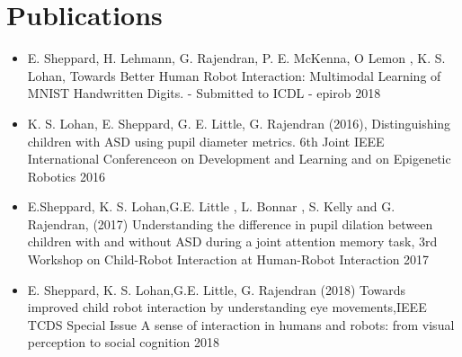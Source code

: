 
\chapter{Publications} %

\label{AppendixA} %

\label{app:A}
\begin{itemize}
	\item E. Sheppard, H. Lehmann, G. Rajendran, P. E. McKenna, O Lemon , K. S. Lohan, Towards Better Human Robot Interaction:
Multimodal Learning of MNIST Handwritten Digits. - Submitted to ICDL - epirob 2018
	\item K. S. Lohan, E. Sheppard, G. E. Little, G. Rajendran (2016), Distinguishing children with ASD using pupil diameter metrics. 6th Joint IEEE International Conferenceon on Development and Learning and on Epigenetic Robotics 2016
    \item{E.Sheppard, K. S. Lohan,G.E. Little , L. Bonnar , S. Kelly and G. Rajendran, (2017) Understanding the difference in pupil dilation between children with and
without ASD during a joint attention memory task, 3rd Workshop on Child-Robot Interaction at Human-Robot Interaction 2017}
	\item{E. Sheppard, K. S. Lohan,G.E. Little, G. Rajendran (2018) Towards improved child robot interaction by
understanding eye movements,IEEE TCDS Special Issue A sense of interaction in humans and robots: from visual perception to social cognition 2018}
\end{itemize}


%

%

%

%



